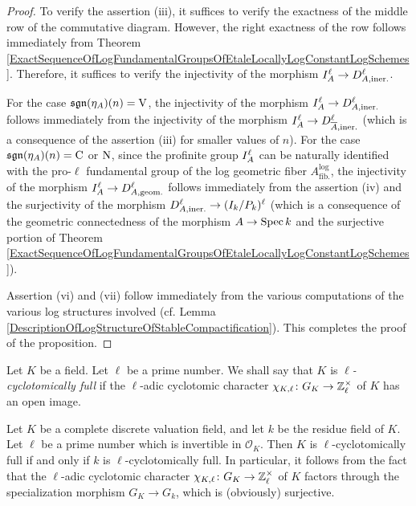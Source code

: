 \begin{proof}
  To verify the assertion (iii), it suffices to verify the exactness of the middle row of the commutative diagram. However, the right exactness of the row follows immediately from Theorem \ref{ExactSequenceOfLogFundamentalGroupsOfEtaleLocallyLogConstantLogSchemes}. Therefore, it suffices to verify the injectivity of the morphism $I^{\ell}_{A} \to D^{\ell}_{A, \text{iner.}}$.

  For the case $\mathfrak{sgn}(\eta_A)(n) = \mathrm{V}$, the injectivity of the morphism $I^{\ell}_{A} \to D^{\ell}_{A, \text{iner.}}$ follows immediately from the injectivity of the morphism $I^{\ell}_{A} \to D^{\ell}_{\overline{A}, \text{iner.}}$ (which is a consequence of the assertion (iii) for smaller values of $n$). For the case $\mathfrak{sgn}(\eta_A)(n) = \mathrm{C}$ or $\mathrm{N}$, since the profinite group $I^{\ell}_{A}$ can be naturally identified with the pro-$\ell$ fundamental group of the log geometric fiber $A_\text{fib.}^\log$, the injectivity of the morphism $I^{\ell}_{A} \to D^{\ell}_{A, \text{geom.}}$ follows immediately from the assertion (iv) and the surjectivity of the morphism $D^{\ell}_{A, \text{iner.}} \to (I_k/P_k)^\ell$ (which is a consequence of the geometric connectedness of the morphism $A \to \mathrm{Spec}\, k$ and the surjective portion of Theorem \ref{ExactSequenceOfLogFundamentalGroupsOfEtaleLocallyLogConstantLogSchemes}).

  Assertion (vi) and (vii) follow immediately from the various computations of the various log structures involved (cf. Lemma \ref{DescriptionOfLogStructureOfStableCompactification}). This completes the proof of the proposition. 
\end{proof}

\begin{defn}
  Let $K$ be a field. Let $\ell$ be a prime number. We shall say that $K$ is \emph{$\ell$-cyclotomically full} if the $\ell$-adic cyclotomic character $\chi_{K, \ell} \colon G_K \to \mathbb{Z}_\ell^\times$ of $K$ has an open image.
\end{defn}

\begin{rem}
  Let $K$ be a complete discrete valuation field, and let $k$ be the residue field of $K$. Let $\ell$ be a prime number which is invertible in $\mathcal{O}_K$. Then $K$ is $\ell$-cyclotomically full if and only if $k$ is $\ell$-cyclotomically full. In particular, it follows from the fact that the $\ell$-adic cyclotomic character $\chi_{K, \ell} \colon G_K \to \mathbb{Z}_\ell^\times$ of $K$ factors through the specialization morphism $G_K \to G_k$, which is (obviously) surjective.
\end{rem}

